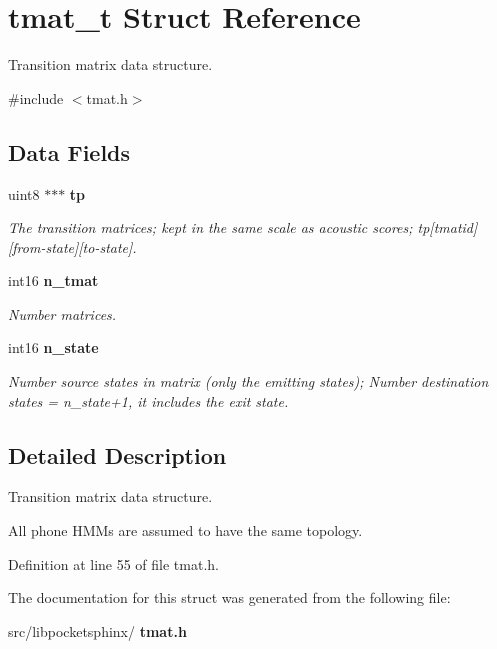\section{tmat\+\_\+t Struct Reference}
\label{structtmat__t}


Transition matrix data structure.  




{\ttfamily \#include $<$tmat.\+h$>$}

\subsection*{Data Fields}
\begin{DoxyCompactItemize}
\item 
\mbox{\label{structtmat__t_a9f518c96b30dab9efdb69bd779a7b5bf}} 
uint8 $\ast$$\ast$$\ast$ \textbf{ tp}
\begin{DoxyCompactList}\small\item\em The transition matrices; kept in the same scale as acoustic scores; tp[tmatid][from-\/state][to-\/state]. \end{DoxyCompactList}\item 
\mbox{\label{structtmat__t_ada644af34d54256f1574870d5f7a6788}} 
int16 \textbf{ n\+\_\+tmat}
\begin{DoxyCompactList}\small\item\em Number matrices. \end{DoxyCompactList}\item 
\mbox{\label{structtmat__t_a3633c71659e30cf23bee1f7efb4b4805}} 
int16 \textbf{ n\+\_\+state}
\begin{DoxyCompactList}\small\item\em Number source states in matrix (only the emitting states); Number destination states = n\+\_\+state+1, it includes the exit state. \end{DoxyCompactList}\end{DoxyCompactItemize}


\subsection{Detailed Description}
Transition matrix data structure. 

All phone H\+M\+Ms are assumed to have the same topology. 

Definition at line 55 of file tmat.\+h.



The documentation for this struct was generated from the following file\+:\begin{DoxyCompactItemize}
\item 
src/libpocketsphinx/\textbf{ tmat.\+h}\end{DoxyCompactItemize}
